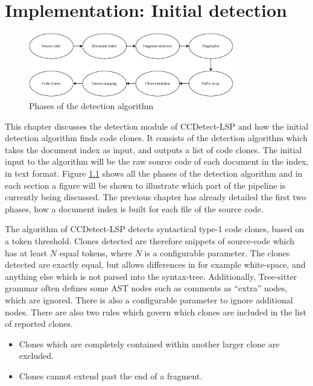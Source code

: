 \chapter{Implementation: Initial detection}
\label{initialdetection}

\begin{figure}[H]
    \begin{center}
        \includegraphics[width=0.8\textwidth]{figures/phases/phases_all.drawio.pdf}
    \end{center}
    \caption{Phases of the detection algorithm}
    \label{fig:allphases}
\end{figure}

This chapter discusses the detection module of CCDetect-LSP and how the initial detection
algorithm finds code clones. It consists of the detection algorithm which takes the
document index as input, and outputs a list of code clones. The initial input to the
algorithm will be the raw source code of each document in the index, in text format.
Figure \ref{fig:allphases} shows all the phases of the detection algorithm and in each
section a figure will be shown to illustrate which part of the pipeline is currently being
discussed. The previous chapter has already detailed the first two phases, how a document
index is built for each file of the source code.

The algorithm of CCDetect-LSP detects syntactical type-1 code clones, based on a token
threshold. Clones detected are therefore snippets of source-code which has at least $N$
equal tokens, where $N$ is a configurable parameter. The clones detected are exactly
equal, but allows differences in for example white-space, and anything else which is not
parsed into the syntax-tree. Additionally, Tree-sitter grammar often defines some AST
nodes such as comments as ``extra'' nodes, which are ignored. There is also a configurable
parameter to ignore additional nodes. There are also two rules which govern which clones
are included in the list of reported clones.

\begin{itemize}
    \item Clones which are completely contained within another larger clone are excluded.
    \item Clones cannot extend past the end of a fragment.
\end{itemize}

